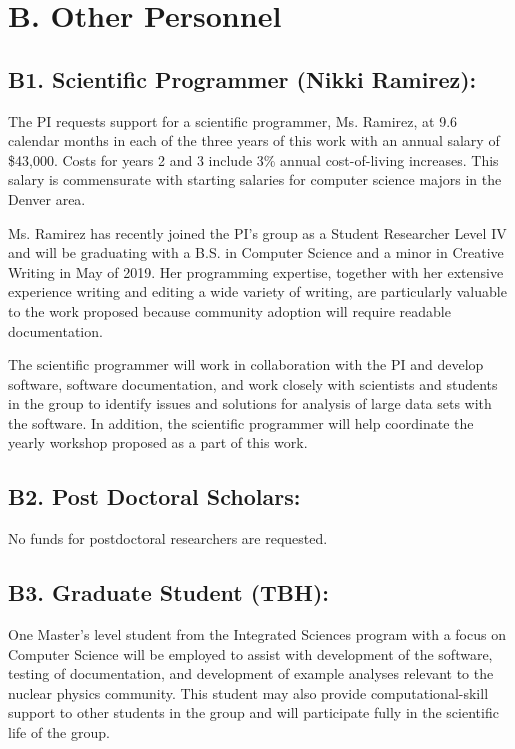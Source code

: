 \documentclass[11pt,oneside]{memoir}
\begin{document}
\section*{B. Other Personnel}

\subsection*{B1. Scientific Programmer (Nikki Ramirez):}
The PI requests support for a scientific programmer, Ms. Ramirez, at 9.6 calendar months in each of the three years of this work with an annual salary of \$43,000. Costs for years 2 and 3 include 3\% annual  cost-of-living increases.  This salary is commensurate with starting salaries for computer science majors in the Denver area.

Ms. Ramirez has recently joined the PI's group as a Student Researcher Level IV and will be graduating with a B.S. in Computer Science and a minor in Creative Writing in May of 2019.  Her programming expertise, together with her extensive experience writing and editing a wide variety of writing, are particularly valuable to the work proposed because community adoption will require readable documentation.

The scientific programmer will work in collaboration with the PI and develop software, software documentation, and work closely with scientists and students in the group to identify issues and solutions for analysis of large data sets with the software.  In addition, the scientific programmer will help coordinate the yearly workshop proposed as a part of this work.


\subsection{B2.  Post Doctoral Scholars:}

No funds for postdoctoral researchers are requested.


\subsection[B3]{B3. Graduate Student (TBH):} 
\label{sec:masters-student-salary}
One Master's level student from the Integrated Sciences program with a focus on Computer Science will be employed to assist with development of the software, testing of documentation, and development of example analyses relevant to the nuclear physics community.  This student may also provide computational-skill support to other students in the group and will participate fully in the scientific life of the group.  
\end{document}
